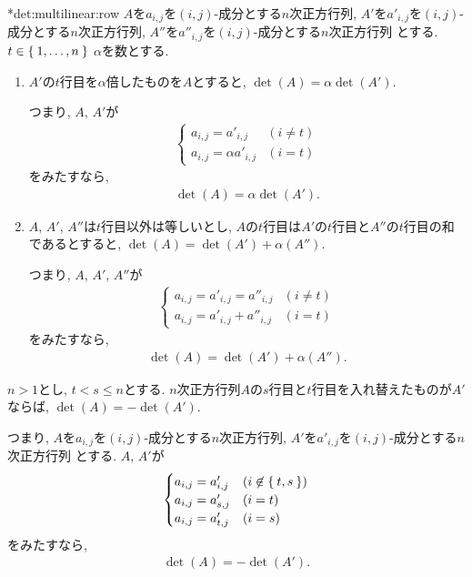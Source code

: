 \begin{theorem}
  \provelater**{det:multilinear:row}
  \label{thm:det:multilinear:row}
  $A$を$a_{i,j}$を$(i,j)$-成分とする$n$次正方行列,
  $A'$を$a'_{i,j}$を$(i,j)$-成分とする$n$次正方行列,
  $A''$を$a''_{i,j}$を$(i,j)$-成分とする$n$次正方行列
  とする.
  $t\in\Set{1,\ldots,n}$
  $\alpha$を数とする.
  \begin{enumerate}
  \item
    \label{thm:det:multilinear:row:scalar}
    $A'$の$t$行目を$\alpha$倍したものを$A$とすると,
    $\det(A)=\alpha\det(A')$.

    つまり,
    $A$, $A'$が
    \begin{align*}
      \begin{cases}
        a_{i,j}=a'_{i,j} & (i\neq t)\\
        a_{i,j}=\alpha a'_{i,j} & (i = t)
      \end{cases}
    \end{align*}
    をみたすなら,
    \begin{align*}
      \det(A)=\alpha\det(A').
    \end{align*}
  \item
    \label{thm:det:multilinear:row:sum}
    $A$, $A'$, $A''$は$t$行目以外は等しいとし,
    $A$の$t$行目は$A'$の$t$行目と$A''$の$t$行目の和であるとすると,
    $\det(A)=\det(A')+\alpha(A'')$.

    つまり,
    $A$, $A'$, $A''$が
    \begin{align*}
      \begin{cases}
        a_{i,j}=a'_{i,j} = a''_{i,j} & (i\neq t)\\
        a_{i,j}=a'_{i,j} + a''_{i,j} & (i = t)
      \end{cases}
    \end{align*}
    をみたすなら,
    \begin{align*}
      \det(A)=\det(A')+\alpha(A'').
    \end{align*}
  \end{enumerate}
\end{theorem}


\begin{theorem}
  \label{thm:det:alt:row:neg}
  $n>1$とし, $t<s\leq n$とする. 
  $n$次正方行列$A$の$s$行目と$t$行目を入れ替えたものが$A'$ならば,
  $\det(A)=-\det(A')$.

  つまり, 
  $A$を$a_{i,j}$を$(i,j)$-成分とする$n$次正方行列,
  $A'$を$a'_{i,j}$を$(i,j)$-成分とする$n$次正方行列
  とする.
  $A$, $A'$が
  \begin{align*}
    \begin{cases}
      a_{i,j}=a'_{i,j} & (i\not\in \Set{t,s})\\
      a_{i,j}=a'_{s,j} & (i = t)\\
      a_{i,j}=a'_{t,j} & (i = s)
    \end{cases}
  \end{align*}
  をみたすなら,
  \begin{align*}
    \det(A)=-\det(A').
  \end{align*}
\end{theorem}

